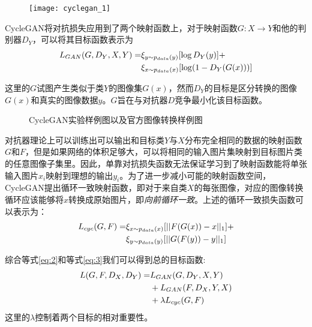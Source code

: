 \begin{figure}[h]
    \centering
    \texttt{[image: cyclegan\_1]}
    \label{cyclegan_1}
    \caption{}
\end{figure}

CycleGAN将对抗损失应用到了两个映射函数上，对于映射函数$G:X\to Y$和他的判别器$D_Y$，可以将其目标函数表示为
\begin{align*}
    \label{eq:2}
    \centering
    L_{GAN}(G,D_Y,X,Y)= & \xi_{y\sim p_{data}(y)}[\log D_Y(y)] + \\
    & \xi_{x\sim p_{data}(x)}[\log (1-D_Y(G(x)))]
\end{align*}

这里的$G$试图产生类似于类$Y$的图像集$G(x)$，然而$D_Y$的目标是区分转换的图像$G(x)$和真实的图像数据$y$。$G$旨在与对抗器$D$竞争最小化该目标函数。

\begin{figure}[b]
    \centering
    \caption{CycleGAN实验样例图以及官方图像转换样例图}
    \label{fig:cyclegan}
\end{figure}

对抗器理论上可以训练出可以输出和目标类$Y$与$X$分布完全相同的数据的映射函数$G$和$F$，但是如果网络的体积足够大，可以将相同的输入图片集映射到目标图片类的任意图像子集里。因此，单靠对抗损失函数无法保证学习到了映射函数能将单张输入图片$x_i$映射到理想的输出$y_i$。为了进一步减小可能的映射函数空间，CycleGAN提出循环一致映射函数，即对于来自类$X$的每张图像，对应的图像转换循环应该能够将$x$转换成原始图片，即\textit{向前循环一致}。上述的循环一致损失函数可以表示为：
\begin{align*}
    \label{eq:3}
    \centering
    L_{cyc}(G,F)= & \xi_{x\sim p_{data}(x)}[||F(G(x))-x||_1] + \\
    & \xi_{y\sim p_{data}(y)}[||G(F(y))-y||_1]
\end{align*}

综合等式\ref{eq:2}和等式\ref{eq:3}我们可以得到总的目标函数:
\begin{align*}
    \centering
    L(G, F, D_X, D_Y) = & L_{GAN}(G,D_Y, X, Y) \\
    & + L_{GAN}(F,D_X, Y, X) \\
    & + \lambda L_{cyc}(G, F)
\end{align*}
这里的$\lambda$控制着两个目标的相对重要性。


